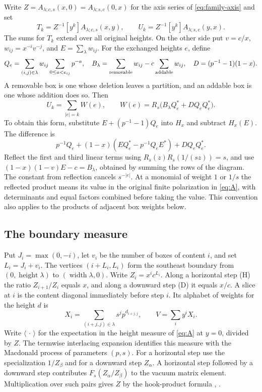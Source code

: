 Write $Z=A_{\lambda;c,s}(x,0)=A_{\lambda;s,c}(0,x)$ for the axis series of \eqref{eq:family-axis} and set
\[
 T_k=Z^{-1}[y^k]A_{\lambda;c,s}(x,y),\qquad
 U_k=Z^{-1}[y^k]A_{\lambda;s,c}(y,x).
\]
The sums for $T_k$ extend over all original heights. On the other side put $v=c/x$, $w_{ij}=x^{-i}v^{-j}$, and $E=\sum_{\lambda}w_{ij}$. For the exchanged heights $e$, define
\[
 Q_e=\sum_{(i,j)\in\lambda}w_{ij}
            \sum_{0\le a<e_{ij}}p^{-a},\quad
 B_\lambda=\sum_{\rm removable}w_{ij}-c\sum_{\rm addable}w_{ij},
 \quad D=(p^{-1}-1)(1-x).
\]
A removable box is one whose deletion leaves a partition, and an addable box is one whose addition does so. Then
\begin{equation}\label{eq:W}
 U_k=\sum_{|e|=k}W(e),\qquad
 W(e)=R_s\big(B_\lambda Q_e^*+D Q_eQ_e^*\big).
\end{equation}
To obtain this form, substitute $E+(p^{-1}-1)Q_e$ into $H_x$ and subtract $H_x(E)$. The difference is
\[
 p^{-1}Q_e+(1-x)(EQ_e^*-p^{-1}Q_eE^*)+D Q_eQ_e^* .
\]
Reflect the first and third linear terms using $R_s(z)R_s(1/(sz))=s$, and use $(1-x)(1-v)E-c=B_\lambda$, obtained by summing the rows of the diagram. The constant from reflection cancels $s^{-|e|}$. At a monomial of weight $1$ or $1/s$ the reflected product means its value in the original finite polarization in \eqref{eq:A}, with determinants and equal factors combined before taking the value. This convention also applies to the products of adjacent box weights below.

\subsection{The boundary measure}
Put $J_i=\max(0,-i)$, let $v_i$ be the number of boxes of content $i$, and set $L_i=J_i+v_i$. The vertices $(i+L_i,L_i)$ form the southeast boundary from $(0,\operatorname{height}\lambda)$ to $(\operatorname{width}\lambda,0)$. Write $Z_i=x^ic^{L_i}$. Along a horizontal step (H) the ratio $Z_{i+1}/Z_i$ equals $x$, and along a downward step (D) it equals $x/c$. A slice at $i$ is the content diagonal immediately before step $i$. Its alphabet of weights for the height $d$ is
\[
 X_i=\sum_{(i+j,j)\in\lambda}s^j p^{d_{i+j,j}},
 \qquad V=\sum_i y^i X_i .
\]
Write $\langle\,\cdot\,\rangle$ for the expectation in the height measure of \eqref{eq:A} at $y=0$, divided by $Z$. The termwise interlacing expansion identifies this measure with the Macdonald process of parameters $(p,s)$. For a horizontal step use the specialization $1/Z_\beta$ and for a downward step $Z_\alpha$. A horizontal step followed by a downward step contributes $F_s(Z_\alpha/Z_\beta)$ to the vacuum matrix element. Multiplication over such pairs gives $Z$ by the hook-product formula \cite[\S3, Propositions~6--7]{DS}, \cite[Lemma~5.1]{W1}.

